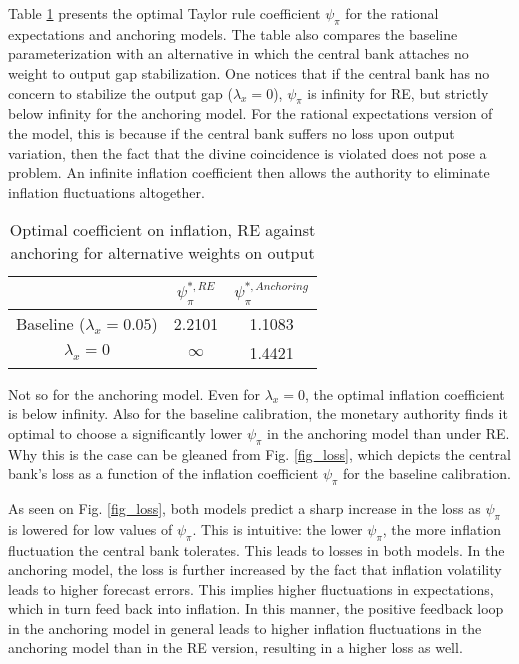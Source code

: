 \documentclass[11pt]{article}
\renewcommand{\[}{\begin{equation}}
\renewcommand{\]}{\end{equation}}
\begin{document}
Table \ref{psi_pi_opt} presents the optimal Taylor rule coefficient $\psi_{\pi}$ for the rational expectations and anchoring models. The table also compares the baseline parameterization with an alternative in which the central bank attaches no weight to output gap stabilization. One notices that if the central bank has no concern to stabilize the output gap ($\lambda_x = 0$), $\psi_{\pi}$ is infinity for RE, but strictly below infinity for the anchoring model. For the rational expectations version of the model, this is because if the central bank suffers no loss upon output variation, then the fact that the divine coincidence is violated does not pose a problem. An infinite inflation coefficient then allows the authority to eliminate inflation fluctuations altogether.

\begin{center}
\begin{table}[h!]
\begin{tabular}{ c | c | c }
 & $\psi^{*,RE}_{\pi}$ & $\psi^{*,Anchoring}_{\pi}$  \\  \hline
 Baseline ($\lambda_x =0.05$)  & 2.2101   & 1.1083\\  \hline
 $\lambda_x =0$     & $\infty$  & 1.4421 \\  \hline

\end{tabular}     
      \caption{Optimal coefficient on inflation, RE against anchoring for alternative weights on output}  
      \label{psi_pi_opt}
 \end{table}
\end{center}

Not so for the anchoring model. Even for $\lambda_x = 0$, the optimal inflation coefficient is below infinity. Also for the baseline calibration, the monetary authority finds it optimal to choose a significantly lower $\psi_{\pi}$ in the anchoring model than under RE. Why this is the case can be gleaned from Fig. \ref{fig_loss}, which depicts the central bank's loss as a function of the inflation coefficient $\psi_{\pi}$ for the baseline calibration. %

As seen on Fig. \ref{fig_loss}, both models predict a sharp increase in the loss as $\psi_{\pi}$ is lowered for low values of $\psi_{\pi}$. This is intuitive: the lower $\psi_{\pi}$, the more inflation fluctuation the central bank tolerates. This leads to losses in both models. In the anchoring model, the loss is further increased by the fact that inflation volatility leads to higher forecast errors. This implies higher fluctuations in expectations, which in turn feed back into inflation. In this manner, the positive feedback loop in the anchoring model in general leads to higher inflation fluctuations in the anchoring model than in the RE version, resulting in a higher loss as well. 
\end{document}

